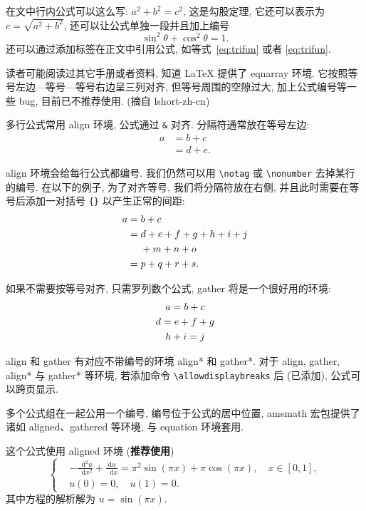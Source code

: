 \documentclass[12pt,final]{article}
\numberwithin{equation}{section}
\numberwithin{figure}{section}
\numberwithin{table}{section}
\theoremstyle{plain}
\newcommand{\dif}{\mathop{}\!\mathrm{d}}
\begin{document}
在文中行内公式可以这么写: $a^2+b^2=c^2$, 这是勾股定理, 它还可以表示为 $c=\sqrt{a^2+b^2}$, 还可以让公式单独一段并且加上编号
\begin{equation}\label{eq:trifun}
\sin^2{\theta}+\cos^2{\theta}=1.
\end{equation}
还可以通过添加标签在正文中引用公式, 如等式~\eqref{eq:trifun} 或者 \ref{eq:trifun}.

读者可能阅读过其它手册或者资料, 知道 LaTeX 提供了 eqnarray 环境. 它按照等号左边—等号—等号右边呈三列对齐, 但等号周围的空隙过大, 加上公式编号等一些 bug, 目前已不推荐使用. (摘自 lshort-zh-cn)

多行公式常用 align 环境, 公式通过 \verb|&| 对齐. 分隔符通常放在等号左边:
\begin{align}
a & = b + c \\
& = d + e.
\end{align}

align 环境会给每行公式都编号. 我们仍然可以用 \verb|\notag| 或 \verb|\nonumber| 去掉某行的编号. 在以下的例子,
为了对齐等号, 我们将分隔符放在右侧, 并且此时需要在等号后添加一对括号 \verb|{}| 以产生正常的间距:
\begin{align}
a ={} & b + c \\
={} & d + e + f + g + h + i + j \notag \\
& + m + n + o \\
={} & p + q + r + s.
\end{align}

如果不需要按等号对齐, 只需罗列数个公式, gather 将是一个很好用的环境:
\begin{gather}
a = b + c \\
d = e + f + g \notag \\
h + i = j
\end{gather}

align 和 gather 有对应不带编号的环境 align* 和 gather*.
对于 align, gather, align* 与 gather* 等环境, 若添加命令 \verb|\allowdisplaybreaks| 后 (已添加), 公式可以跨页显示.

多个公式组在一起公用一个编号, 编号位于公式的居中位置, amsmath 宏包提供了诸如 aligned、gathered 等环境, 与 equation 环境套用.

这个公式使用 aligned 环境 (\textbf{推荐使用})
\begin{equation}\label{eq:alignedEq}
\left\{\begin{aligned}
  &-\frac{{\dif}^{2} u}{\dif x^{2}}+\frac{\mathrm{d} u}{\dif x}=\pi^{2} \sin (\pi x)+\pi \cos (\pi x),\quad x \in [0,1], \\
  &u(0)=0,\quad u(1)=0.
\end{aligned} \right.
\end{equation}
其中方程的解析解为 $u=\sin(\pi x)$.
\end{document}
